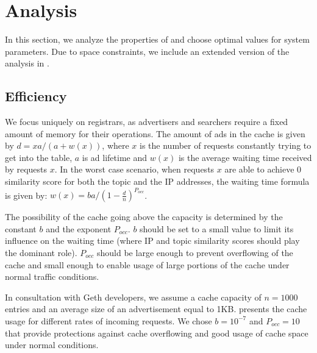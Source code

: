
\section{Analysis}\label{sec:analysis}
In this section, we analyze the properties of \sysname and choose optimal values for system parameters. Due to space constraints, we include an extended version of the analysis in .
\subsection{Efficiency}

We focus uniquely on registrars, as advertisers and searchers require a fixed amount of memory for their operations. The amount of ads in the cache is given by $d = xa/(a + w(x))$, where $x$ is the number of requests constantly trying to get into the table, $a$ is ad lifetime and $w(x)$ is the average waiting time received by requests $x$.
In the worst case scenario, when requests $x$ are able to achieve 0 similarity score for both the topic and the IP addresses, the waiting time formula is given by: $w(x) = ba/(1 - \frac{d}{n})^{P_\textit{occ}}$.

The possibility of the cache going above the capacity is determined by the constant $b$ and the exponent $P_\textit{occ}$. $b$ should be set to a small value to limit its influence on the waiting time (where IP and topic similarity scores should play the dominant role). $P_\textit{occ}$ should be large enough to prevent overflowing of the cache and small enough to enable usage of large portions of the cache under normal traffic conditions. 

In consultation with Geth developers, we assume a cache capacity of $n = 1000$ entries  and an average size of an advertisement equal to 1KB.  presents the cache usage for different rates of incoming requests. We chose $b=10^{-7}$ and $P_\textit{occ}=10$ that provide protections against cache overflowing and good usage of cache space under normal conditions. 

